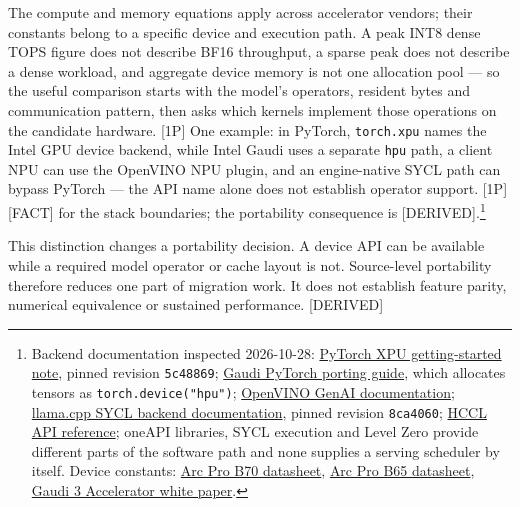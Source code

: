 The compute and memory equations apply across accelerator vendors; their
constants belong to a specific device and execution path. A peak INT8
dense TOPS figure does not describe BF16 throughput, a sparse peak does
not describe a dense workload, and aggregate device memory is not one
allocation pool --- so the useful comparison starts with the model's
operators, resident bytes and communication pattern, then asks which
kernels implement those operations on the candidate hardware. \mbox{{[}1P{]}}
One example: in PyTorch, \texttt{torch.xpu} names the Intel GPU device
backend, while Intel Gaudi uses a separate \texttt{hpu} path, a client
NPU can use the OpenVINO NPU plugin, and an engine-native SYCL path can
bypass PyTorch --- the API name alone does not establish operator
support. \mbox{{[}1P{]}}\hspace{0pt}\mbox{{[}FACT{]}} for the stack boundaries; the portability
consequence is \mbox{{[}DERIVED{]}}.\footnote{Backend documentation inspected
  2026-10-28:
  \href{https://raw.githubusercontent.com/pytorch/pytorch/5c4886908584029761b579af026dcfb627c84070/docs/source/notes/get_start_xpu.md}{PyTorch
  XPU getting-started note}, pinned revision \texttt{5c48869};
  \href{https://docs.habana.ai/en/latest/PyTorch/PyTorch_Model_Porting/Porting_PyTorch_Models_to_Gaudi.html}{Gaudi
  PyTorch porting guide}, which allocates tensors as
  \texttt{torch.device("hpu")};
  \href{https://docs.openvino.ai/2026/openvino-workflow-generative/inference-with-genai.html}{OpenVINO
  GenAI documentation};
  \href{https://raw.githubusercontent.com/ggml-org/llama.cpp/8ca4060b7e30e76baaa5670ee1ec1b760b7f8552/docs/backend/SYCL.md}{llama.cpp
  SYCL backend documentation}, pinned revision \texttt{8ca4060};
  \href{https://docs.habana.ai/en/latest/API_Reference_Guides/HCCL_APIs/index.html}{HCCL
  API reference}; oneAPI libraries, SYCL execution and Level Zero
  provide different parts of the software path and none supplies a
  serving scheduler by itself. Device constants:
  \href{https://intel.com/content/dam/www/central-libraries/us/en/documents/2026-03/datasheet-b70-gpu.pdf}{Arc
  Pro B70 datasheet},
  \href{https://intel.com/content/dam/www/central-libraries/us/en/documents/2026-03/datasheet-b65-gpu.pdf}{Arc
  Pro B65 datasheet},
  \href{https://cdrdv2-public.intel.com/817486/gaudi-3-ai-accelerator-white-paper.pdf}{Gaudi
  3 Accelerator white paper}.}

This distinction changes a portability decision. A device API can be
available while a required model operator or cache layout is not.
Source-level portability therefore reduces one part of migration work.
It does not establish feature parity, numerical equivalence or sustained
performance. \mbox{{[}DERIVED{]}}

